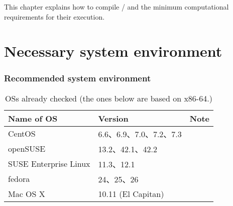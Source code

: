 This chapter explains how to compile \scalelib / \scalerm
and the minimum computational requirements for their execution.

\section{Necessary system environment} \label{sec:req_env}
\subsubsection{Recommended system environment}

\begin{table}[b]
\begin{center}
\caption{OSs already checked (the ones below are based on x86-64.)}
\begin{tabularx}{150mm}{|l|l|X|} \hline
 \rowcolor[gray]{0.9} Name of OS & Version & Note \\ \hline
 CentOS                & 6.6、6.9、7.0、7.2、7.3 &  \\ \hline
 openSUSE              & 13.2、42.1、42.2        &  \\ \hline
 SUSE Enterprise Linux & 11.3、12.1         &  \\ \hline
 fedora                & 24、25、26         &  \\ \hline
 Mac OS X              & 10.11 (El Capitan) &  \\ \hline
\end{tabularx}
\label{tab:compatible_os}
\end{center}
\end{table}


